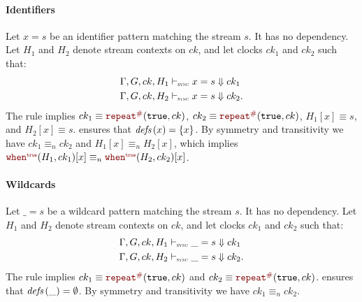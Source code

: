 \begin{skippableproof}
    \paragraph{Identifiers}

    Let $x = s$ be an identifier pattern matching the stream $s$. It has no dependency.
    Let $H_1$ and $H_2$ denote stream contexts on $ck$, and let clocks $ck_1$ and $ck_2$ such that:
    \begin{align*}
         & \patDenot{H_1}{ck}{x = s}{ck_1}  \\
         & \patDenot{H_2}{ck}{x = s}{ck_2}.
    \end{align*}
    The rule  implies $ck_1 \equiv\const{\true}{ck}$,
    $ck_2 \equiv \const{\true}{ck}$, $H_1[x] \equiv s$, and
    $H_2[x] \equiv s$.  ensures that $\defs{x}
        = \{x\}$. By symmetry and transitivity we have $ck_1 \equiv_n ck_2$ and $H_1[x] \equiv_n
        H_2[x]$, which implies $\whenT{H_1}{ck_1}[x] \equiv_n \whenT{H_2}{ck_2}[x]$.

    \paragraph{Wildcards}

    Let $\_ = s$ be a wildcard pattern matching the stream $s$. It has no dependency.
    Let $H_1$ and $H_2$ denote stream contexts on $ck$, and let clocks $ck_1$ and $ck_2$ such that:
    \begin{align*}
         & \patDenot{H_1}{ck}{\_ = s}{ck_1}  \\
         & \patDenot{H_2}{ck}{\_ = s}{ck_2}.
    \end{align*}
    The rule  implies $ck_1 \equiv \const{\true}{ck}$
    and $ck_2 \equiv \const{\true}{ck}$.  ensures that $\defs{\_} = \emptyset$. By symmetry and
    transitivity we have $ck_1 \equiv_n ck_2$.

    \setcounter{paragraph}{0}
\end{skippableproof}


